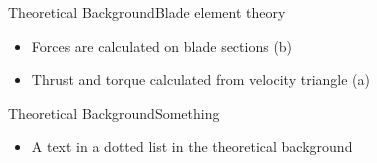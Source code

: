 
\begin{frame}{Theoretical Background}{Blade element theory}
	\begin{itemize}
		\item Forces are calculated on blade sections (b)
		\item Thrust and torque calculated from velocity triangle (a)
	\end{itemize}
	
	\begin{figure}[ht]
		\centering
		\hfil
		\label{fig:blade_triangles}
	\end{figure}
\end{frame}


\begin{frame}{Theoretical Background}{Something}
	\begin{itemize}
		\item A text in a dotted list in the theoretical background
	\end{itemize}
\end{frame}






%
